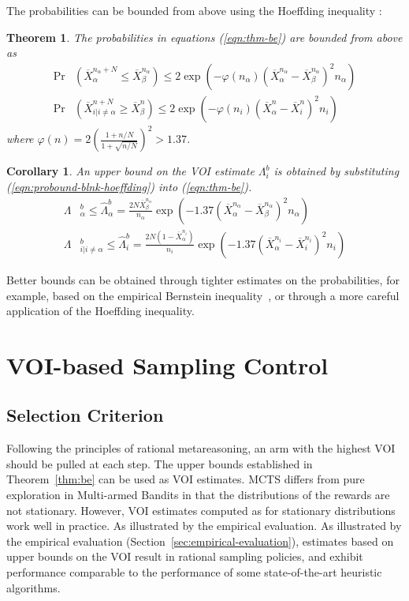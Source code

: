 \documentclass[]{article}
\newtheorem{thm}{Theorem}
\newtheorem{crl}{Corollary}
\begin{document}
The probabilities can be bounded from above using the
Hoeffding inequality \cite{Hoeffding.ineq}:
\begin{thm} The probabilities in equations (\ref{eqn:thm-be}) are bounded from above as
\begin{align}
  \label{eqn:probound-blnk-hoeffding}
  \Pr&(\overline X_\alpha^{{n_\alpha}+N} \le \overline X_\beta^{n_\alpha})
  \le 2\exp\left(- \varphi(n_\alpha)(\overline X_\alpha^{n_\alpha} - \overline X_\beta^{n_\alpha})^2 n_\alpha
  \right)\nonumber\\
  \Pr&(\overline X_{i|i\ne\alpha}^{n+N} \ge \overline X_\beta^n)
  \le 2\exp\left(- \varphi(n_i) (\overline X_\alpha^n -\overline  X_i^n)^2 n_i \right)
\end{align}
where $\varphi(n)=2(\frac {1+n/N} {1+\sqrt {n/N}})^2 > 1.37$.
\label{thm:hoeffding-prob-bounds}
\end{thm}
\begin{crl}
An upper bound on the VOI estimate $\Lambda_i^b$ is obtained
by substituting (\ref{eqn:probound-blnk-hoeffding}) into (\ref{eqn:thm-be}).
\begin{align}
  \label{eqn:bound-blnk-hoeffding}
  \Lambda&_\alpha^b \le \hat\Lambda_\alpha^b=\frac {2N\overline X_\beta^{n_\alpha}} {n_\alpha}\exp\left(- 1.37(\overline X_\alpha^{n_\alpha} - \overline X_\beta^{n_\alpha})^2 n_\alpha\right)\nonumber\\
  \Lambda&_{i|i\ne\alpha}^b\le \hat\Lambda_i^b=  \frac {2N(1-\overline  X_\alpha^{n_i})} {n_i}\exp\left(- 1.37(\overline X_\alpha^{n_i} - \overline X_i^{n_i})^2 n_i\right)
\end{align}
\label{crl:bound-blnk-hoeffding}
\end{crl}
Better bounds can be obtained through tighter estimates on the
probabilities, for example, based on the empirical Bernstein
inequality~\cite{MaurerPontil.benrstein}, or through a more careful
application of the Hoeffding inequality.

\section{VOI-based Sampling Control}

\subsection{Selection Criterion}

Following the principles of rational metareasoning, an arm with the
highest VOI should be pulled at each step. The upper bounds
established in Theorem~\ref{thm:be} can be used as VOI estimates. MCTS
differs from pure exploration in Multi-armed Bandits in that the
distributions of the rewards are not stationary. However, VOI
estimates computed as for stationary distributions work well in
practice. As illustrated by the empirical evaluation. As illustrated
by the empirical evaluation (Section~\ref{sec:empirical-evaluation}),
estimates based on upper bounds on the VOI result in rational sampling
policies, and exhibit performance comparable to the performance of
some state-of-the-art heuristic algorithms.
\end{document}
